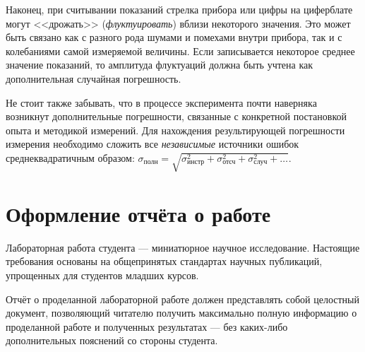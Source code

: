 
Наконец, при считывании показаний стрелка прибора или цифры на циферблате
могут <<дрожать>> (\emph{флуктуировать})
вблизи некоторого значения. Это может быть связано как с разного рода
шумами и помехами внутри прибора, так и с колебаниями самой измеряемой
величины. Если записывается некоторое среднее значение показаний,
то амплитуда флуктуаций должна быть учтена как дополнительная случайная
погрешность.

Не стоит также забывать, что в процессе эксперимента почти наверняка
возникнут дополнительные погрешности, связанные с конкретной постановкой
опыта и методикой измерений. Для нахождения результирующей погрешности
измерения необходимо сложить все \emph{независимые} источники ошибок
среднеквадратичным образом: $\sigma_{\text{полн}}=\sqrt{\sigma_{\text{инстр}}^{2}+
\sigma_{\text{отсч}}^{2}+\sigma_{\text{случ}}^{2}+\ldots}$. 


\section{Оформление отчёта о работе}

Лабораторная работа студента --- миниатюрное научное исследование.
Настоящие требования основаны на общепринятых стандартах научных публикаций,
упрощенных для студентов младших курсов.

Отчёт о проделанной лабораторной работе должен представлять собой
целостный документ, позволяющий читателю получить максимально полную
информацию о проделанной работе и полученных результатах ---
без каких-либо дополнительных пояснений со стороны студента.


